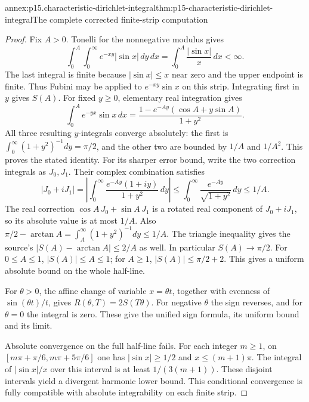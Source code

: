 \begin{annexitem}{annex:p15.characteristic-dirichlet-integral}{thm:p15-characteristic-dirichlet-integral}{The complete corrected finite-strip computation}
\begin{proof}
Fix \(A>0\). Tonelli for the nonnegative modulus gives
\[
 \int_0^A\int_0^\infty e^{-xy}|\sin x|\,dy\,dx
       =\int_0^A\frac{|\sin x|}{x}\,dx<\infty.
\]
The last integral is finite because \(|\sin x|\leq x\)
near zero and the upper endpoint is finite.
Thus Fubini may be applied to \(e^{-xy}\sin x\)
on this strip. Integrating first in \(y\) gives \(S(A)\).
For fixed \(y\geq0\), elementary real integration gives
\[
 \int_0^A e^{-yx}\sin x\,dx
       =\frac{1-e^{-Ay}(\cos A+y\sin A)}{1+y^2}.
\]
All three resulting \(y\)-integrals converge absolutely:
the first is \(\int_0^\infty(1+y^2)^{-1}dy=\pi/2\),
and the other two are bounded by \(1/A\) and \(1/A^2\).
This proves the stated identity. For its sharper error bound,
write the two correction integrals as \(J_0,J_1\).
Their complex combination satisfies
\[
 |J_0+iJ_1|
  =\left|\int_0^\infty\frac{e^{-Ay}(1+iy)}{1+y^2}\,dy\right|
  \leq\int_0^\infty\frac{e^{-Ay}}{\sqrt{1+y^2}}\,dy
  \leq1/A.
\]
The real correction \(\cos A\,J_0+\sin A\,J_1\)
is a rotated real component of \(J_0+iJ_1\), so its
absolute value is at most \(1/A\).
Also \(\pi/2-\arctan A=\int_A^\infty(1+y^2)^{-1}dy\leq1/A\).
The triangle inequality gives the source's
\(|S(A)-\arctan A|\leq2/A\) as well.
In particular \(S(A)\to\pi/2\).
For \(0\leq A\leq1\), \(|S(A)|\leq A\leq1\);
for \(A\geq1\), \(|S(A)|\leq\pi/2+2\).
This gives a uniform absolute bound on the whole half-line.

For \(\theta>0\), the affine change of variable
\(x=\theta t\), together with evenness of
\(\sin(\theta t)/t\), gives
\(R(\theta,T)=2S(T\theta)\).
For negative \(\theta\) the sign reverses, and for
\(\theta=0\) the integral is zero. These give the
unified sign formula, its uniform bound and its limit.

Absolute convergence on the full half-line fails.
For each integer \(m\geq1\), on
\([m\pi+\pi/6,m\pi+5\pi/6]\) one has
\(|\sin x|\geq1/2\) and \(x\leq(m+1)\pi\).
The integral of \(|\sin x|/x\) over this interval is
at least \(1/(3(m+1))\).
These disjoint intervals yield a divergent harmonic
lower bound. This conditional convergence is fully
compatible with absolute integrability on each finite strip.
\end{proof}
\end{annexitem}

